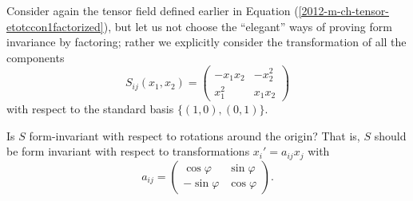 {
\color{blue}
\bexample


Consider again the tensor field defined
earlier in Equation
(\ref{2012-m-ch-tensor-etotccon1factorized}),
but let us not choose the ``elegant''
ways of proving form invariance by factoring; rather we explicitly
consider the transformation of all the  components
$$S_{ij}(x_1,x_2)
=
\begin{pmatrix}
 -x_1x_2 & - x_2^2  \\
 x_1^2 & x_1x_2
\end{pmatrix}
$$
with respect to the standard basis  $\{(1,0), (0,1)\}$.

Is $S$ form-invariant with respect to rotations around the origin?
That is, $S$ should be form invariant with respect to transformations
$x_i' = a_{ij} x_j$
with
$$
a_{ij}=\begin{pmatrix}
 \cos \varphi & \sin \varphi  \\
  -\sin \varphi & \cos \varphi
\end{pmatrix}.
$$


}
